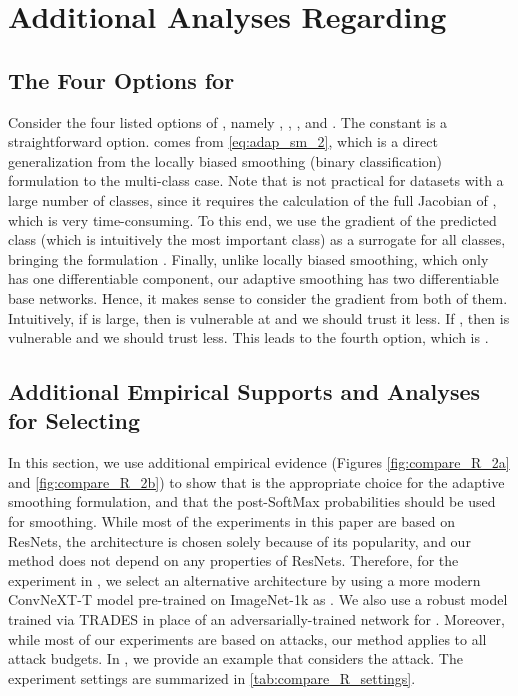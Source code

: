 \documentclass[11pt, letterpaper]{article}
\theoremstyle{plain}
\theoremstyle{definition}
\begin{document}
\section{Additional Analyses Regarding } \label{sec:more_R_analyses}

\subsection{The Four Options for } \label{sec:R_options}

Consider the four listed options of , namely , , , and . The constant  is a straightforward option.  comes from \cref{eq:adap_sm_2}, which is a direct generalization from the locally biased smoothing (binary classification) formulation to the multi-class case. Note that  is not practical for datasets with a large number of classes, since it requires the calculation of the full Jacobian of , which is very time-consuming. To this end, we use the gradient of the predicted class (which is intuitively the most important class) as a surrogate for all classes, bringing the formulation . Finally, unlike locally biased smoothing, which only has one differentiable component, our adaptive smoothing has two differentiable base networks. Hence, it makes sense to consider the gradient from both of them. Intuitively, if  is large, then  is vulnerable at  and we should trust it less. If , then  is vulnerable and we should trust  less. This leads to the fourth option, which is .


\subsection{Additional Empirical Supports and Analyses for Selecting } \label{sec:more_compare_R}

In this section, we use additional empirical evidence (Figures \ref{fig:compare_R_2a} and \ref{fig:compare_R_2b}) to show that  is the appropriate choice for the adaptive smoothing formulation, and that the post-SoftMax probabilities should be used for smoothing. While most of the experiments in this paper are based on ResNets, the architecture is chosen solely because of its popularity, and our method does not depend on any properties of ResNets. Therefore, for the experiment in , we select an alternative architecture by using a more modern ConvNeXT-T model \citep{Liu22} pre-trained on ImageNet-1k as . We also use a robust model trained via TRADES in place of an adversarially-trained network for . Moreover, while most of our experiments are based on  attacks, our method applies to all  attack budgets. In , we provide an example that considers the  attack. The experiment settings are summarized in \cref{tab:compare_R_settings}.
\end{document}
